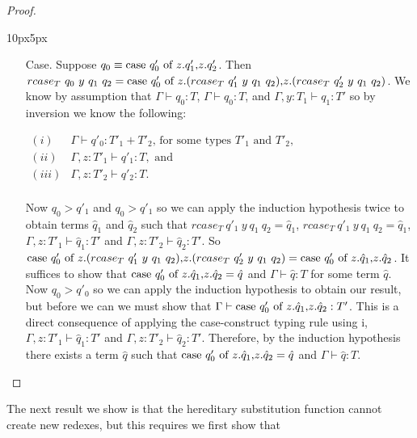 \begin{proof}
\begin{changemargin}{10px}{5px}
\begin{itemize}
\begin{itemize}
\begin{itemize}
    \item[Case.] Suppose $q_0 \equiv \mbox{case}\ q'_0\ \text{of}\ z\text{.}q'_1\text{,}z\text{.}q'_2$.  Then \\
      $rcase_{T}\ q_0\ y\ q_1\ q_2 = \ccon{q'_0}{z}{(rcase_{T}\ q'_1\ y\ q_1\ q_2)}{(rcase_{T}\ q'_2\ y\ q_1\ q_2)}$.
      We know by assumption that $\Gamma \vdash q_0:T$, $\Gamma \vdash q_0:T$, and $\Gamma, y:T_1 \vdash q_1:T'$
      so by inversion we know the following:
      \begin{center}
        \begin{math}
          \begin{array}{lll}
            (i) & \Gamma \vdash q'_0:T'_1 + T'_2 \text{, for some types } T'_1 \text{ and } T'_2,\\
            (ii) & \Gamma, z:T'_1 \vdash q'_1:T, \text{ and }\\
            (iii) & \Gamma, z:T'_2 \vdash q'_2:T.\\
          \end{array}
        \end{math}
      \end{center}
      Now $q_0 > q'_1$ and $q_0 > q'_1$ so we can apply the induction hypothesis twice to obtain terms $\hat{q}_1$ and
      $\hat{q}_2$ such that $rcase_{T}\ q'_1\ y\ q_1\ q_2 = \hat{q}_1$, $rcase_{T}\ q'_1\ y\ q_1\ q_2 = \hat{q}_1$,
      $\Gamma, z:T'_1 \vdash \hat{q}_1:T'$ and $\Gamma, z:T'_2 \vdash \hat{q}_2:T'$. So
      $\ccon{q'_0}{z}{(rcase_{T}\ q'_1\ y\ q_1\ q_2)}{(rcase_{T}\ q'_2\ y\ q_1\ q_2)} = 
      \ccon{q'_0}{z}{\hat{q}_1}{\hat{q}_2}$.  It suffices to show that $\mbox{case}\ q'_0\ \text{of}\ z\text{.}\hat{q}_1\text{,}z\text{.}\hat{q}_2 = \hat{q}$ 
      and $\Gamma \vdash \hat{q}:T$ for some term $\hat{q}$.  Now $q_0 > q'_0$ so we can apply the induction hypothesis
      to obtain our result, but before we can we must show that $\Gamma \vdash \mbox{case}\ q'_0\ \text{of}\ z\text{.}\hat{q}_1\text{,}z\text{.}\hat{q}_2:T'$.
      This is a direct consequence of applying the case-construct typing rule using i, $\Gamma, z:T'_1 \vdash \hat{q}_1:T'$
      and $\Gamma, z:T'_2 \vdash \hat{q}_2:T'$.  Therefore, by the induction hypothesis there exists a term $\hat{q}$ 
      such that $\mbox{case}\ q'_0\ \text{of}\ z\text{.}\hat{q}_1\text{,}z\text{.}\hat{q}_2 = \hat{q}$ and $\Gamma \vdash \hat{q}:T$.
    \end{itemize}
  \end{itemize}
\end{itemize}
\end{changemargin}
\end{proof}
The next result we show is that the hereditary substitution function
cannot create new redexes, but this requires we first show that
